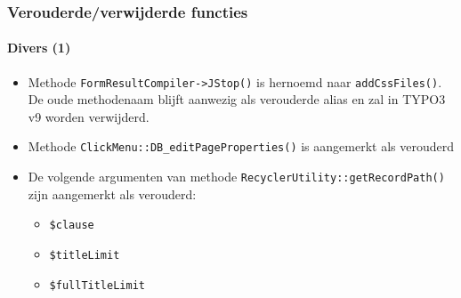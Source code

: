 \begin{frame}[fragile]
	\frametitle{Verouderde/verwijderde functies}
	\framesubtitle{Divers (1)}

	\begin{itemize}
		\item Methode \texttt{FormResultCompiler->JStop()} is hernoemd naar \texttt{addCssFiles()}.
			De oude methodenaam blijft aanwezig als verouderde alias en zal in TYPO3 v9 worden verwijderd.

		\item Methode \texttt{ClickMenu::DB\_editPageProperties()} is aangemerkt als verouderd

		\item De volgende argumenten van methode \texttt{RecyclerUtility::getRecordPath()} zijn aangemerkt als verouderd:
			\begin{itemize}
				\item \texttt{\$clause}
				\item \texttt{\$titleLimit}
				\item \texttt{\$fullTitleLimit}
			\end{itemize}

	\end{itemize}

\end{frame}


